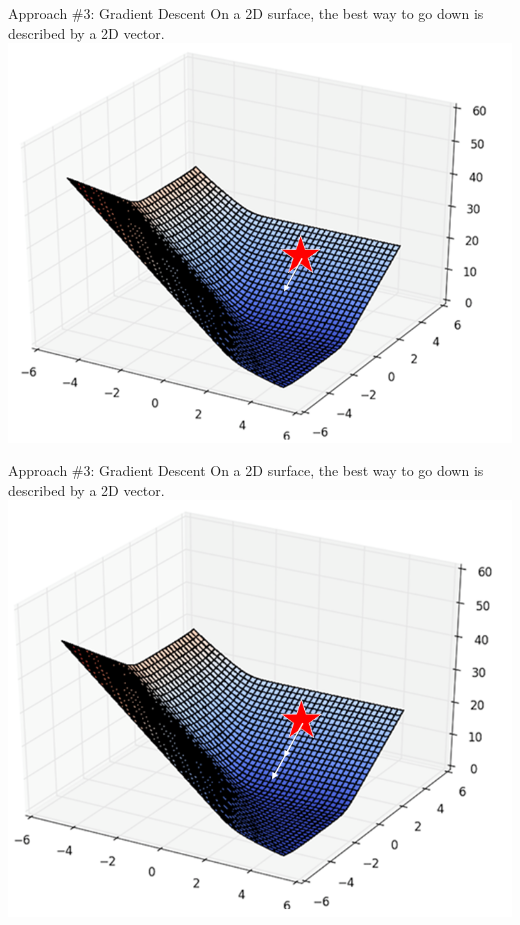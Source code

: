 \documentclass[aspectratio=169]{../latex_main/tntbeamer}  %
\begin{document}
	
	\begin{frame}{Approach \#3: Gradient Descent}
	    On a 2D surface, the best way to go down is described by a 2D vector.\\
	    \centering
	    \includegraphics[scale=.4]{Bild19}
	\end{frame}
	
	\begin{frame}{Approach \#3: Gradient Descent}
	    On a 2D surface, the best way to go down is described by a 2D vector.\\
	    \centering
	    \includegraphics[scale=.4]{Bild20}
	\end{frame}
	
\end{document}
